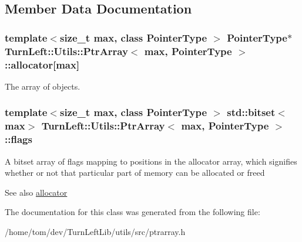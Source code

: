 \subsection{Member Data Documentation}
\hypertarget{classTurnLeft_1_1Utils_1_1PtrArray_afd0b2ddd5366a840347a2a7bf22e806e}{
\subsubsection[{allocator}]{\setlength{\rightskip}{0pt plus 5cm}template$<$size\_\-t max, class PointerType $>$ PointerType$\ast$ {\bf TurnLeft::Utils::PtrArray}$<$ max, PointerType $>$::{\bf allocator}\mbox{[}max\mbox{]}}}
\label{classTurnLeft_1_1Utils_1_1PtrArray_afd0b2ddd5366a840347a2a7bf22e806e}
The array of objects. \hypertarget{classTurnLeft_1_1Utils_1_1PtrArray_ade5460384048e16db12162996bd074cf}{
\subsubsection[{flags}]{\setlength{\rightskip}{0pt plus 5cm}template$<$size\_\-t max, class PointerType $>$ std::bitset$<$max$>$ {\bf TurnLeft::Utils::PtrArray}$<$ max, PointerType $>$::{\bf flags}}}
\label{classTurnLeft_1_1Utils_1_1PtrArray_ade5460384048e16db12162996bd074cf}
A bitset array of flags mapping to positions in the allocator array, which signifies whether or not that particular part of memory can be allocated or freed \begin{DoxySeeAlso}{See also}
\hyperlink{classTurnLeft_1_1Utils_1_1PtrArray_afd0b2ddd5366a840347a2a7bf22e806e}{allocator} 
\end{DoxySeeAlso}


The documentation for this class was generated from the following file:\begin{DoxyCompactItemize}
\item 
/home/tom/dev/TurnLeftLib/utils/src/ptrarray.h\end{DoxyCompactItemize}
